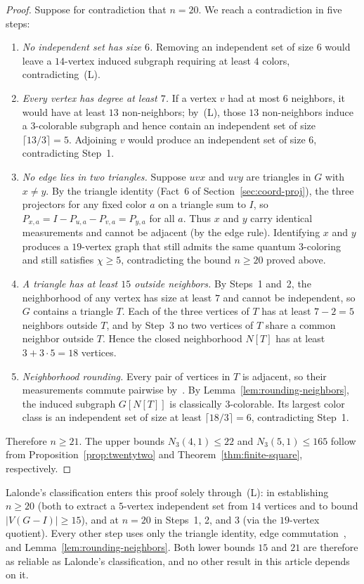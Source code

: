 \begin{proof}
Suppose for contradiction that $n=20$. We reach a contradiction in five steps:
\begin{enumerate}
\item \emph{No independent set has size $6$.} Removing an independent set of size $6$ would leave a $14$-vertex induced subgraph requiring at least $4$ colors, contradicting~(L).
\item \emph{Every vertex has degree at least $7$.} If a vertex $v$ had at most $6$ neighbors, it would have at least $13$ non-neighbors; by~(L), those $13$ non-neighbors induce a $3$-colorable subgraph and hence contain an independent set of size $\lceil13/3\rceil=5$. Adjoining $v$ would produce an independent set of size $6$, contradicting Step~1.
\item \emph{No edge lies in two triangles.} Suppose $uvx$ and $uvy$ are triangles in $G$ with $x\ne y$. By the triangle identity (Fact~6 of Section~\ref{sec:coord-proj}), the three projectors for any fixed color $a$ on a triangle sum to $I$, so $P_{x,a}=I-P_{u,a}-P_{v,a}=P_{y,a}$ for all $a$. Thus $x$ and $y$ carry identical measurements and cannot be adjacent (by the edge rule). Identifying $x$ and $y$ produces a $19$-vertex graph that still admits the same quantum $3$-coloring and still satisfies $\chi\ge5$, contradicting the bound $n\ge20$ proved above.
\item \emph{A triangle has at least $15$ outside neighbors.} By Steps~1 and~2, the neighborhood of any vertex has size at least $7$ and cannot be independent, so $G$ contains a triangle $T$. Each of the three vertices of $T$ has at least $7-2=5$ neighbors outside $T$, and by Step~3 no two vertices of $T$ share a common neighbor outside $T$. Hence the closed neighborhood $N[T]$ has at least $3+3\cdot5=18$ vertices.
\item \emph{Neighborhood rounding.} Every pair of vertices in $T$ is adjacent, so their measurements commute pairwise by~\cite[Lemma~2]{Ji}. By Lemma~\ref{lem:rounding-neighbors}, the induced subgraph $G[N[T]]$ is classically $3$-colorable. Its largest color class is an independent set of size at least $\lceil18/3\rceil=6$, contradicting Step~1.
\end{enumerate}
Therefore $n\ge21$. The upper bounds $N_3(4,1)\le22$ and $N_3(5,1)\le165$ follow from Proposition~\ref{prop:twentytwo} and Theorem~\ref{thm:finite-square}, respectively.
\end{proof}

Lalonde's classification enters this proof solely through~(L): in establishing $n\ge20$ (both to extract a $5$-vertex independent set from $14$ vertices and to bound $|V(G-I)|\ge15$), and at $n=20$ in Steps~1, 2, and 3 (via the $19$-vertex quotient). Every other step uses only the triangle identity, edge commutation~\cite[Lemma~2]{Ji}, and Lemma~\ref{lem:rounding-neighbors}. Both lower bounds $15$ and $21$ are therefore as reliable as Lalonde's classification, and no other result in this article depends on it.
